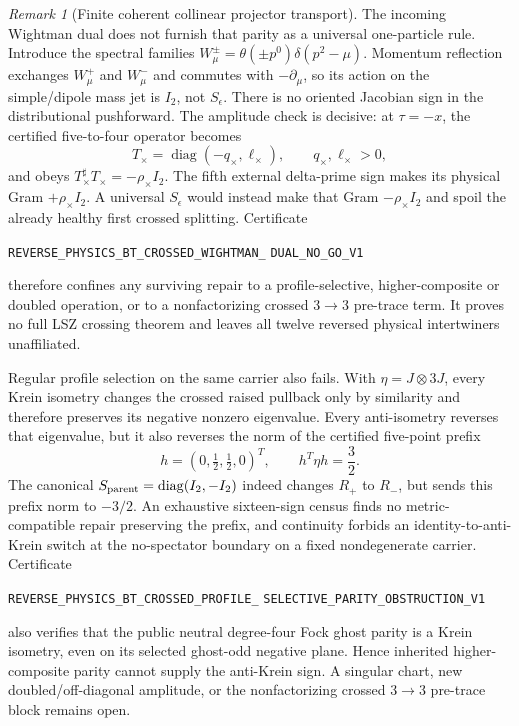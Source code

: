 \documentclass[11pt]{article}
\theoremstyle{definition}
\theoremstyle{remark}
\newtheorem{remark}[theorem]{Remark}
\begin{document}
\begin{remark}[Finite coherent collinear projector transport]
The incoming Wightman dual does not furnish that parity as a universal
one-particle rule.  Introduce the spectral families
$W_\mu^\pm=\theta(\pm p^0)\delta(p^2-\mu)$.  Momentum reflection exchanges
$W_\mu^+$ and $W_\mu^-$ and commutes with $-\partial_\mu$, so its action on
the simple/dipole mass jet is $I_2$, not $S_\epsilon$.  There is no oriented
Jacobian sign in the distributional pushforward.  The amplitude check is
decisive: at $\tau=-x$, the certified five-to-four operator becomes
\[
 T_\times=\operatorname{diag}(-q_\times,\ell_\times),
 \qquad q_\times,\ell_\times>0,
\]
and obeys $T_\times^\sharp T_\times=-\rho_\times I_2$.  The fifth external
delta-prime sign makes its physical Gram $+\rho_\times I_2$.  A universal
$S_\epsilon$ would instead make that Gram $-\rho_\times I_2$ and spoil the
already healthy first crossed splitting.  Certificate
\par\noindent
\texttt{REVERSE\_PHYSICS\_BT\_CROSSED\_WIGHTMAN\_}
\allowbreak\texttt{DUAL\_NO\_GO\_V1}
\par\noindent
therefore confines any surviving repair to a profile-selective,
higher-composite or doubled operation, or to a nonfactorizing crossed
$3\to3$ pre-trace term.  It proves no full LSZ crossing theorem and leaves
all twelve reversed physical intertwiners unaffiliated.

Regular profile selection on the same carrier also fails.  With
$\eta=J\otimes3J$, every Krein isometry changes the crossed raised pullback
only by similarity and therefore preserves its negative nonzero eigenvalue.
Every anti-isometry reverses that eigenvalue, but it also reverses the norm of
the certified five-point prefix
\[
 h=(0,\tfrac12,\tfrac12,0)^T,
 \qquad h^T\eta h=\frac32.
\]
The canonical $S_{\rm parent}=\operatorname{diag}(I_2,-I_2)$ indeed changes
$R_+$ to $R_-$, but sends this prefix norm to $-3/2$.  An exhaustive
sixteen-sign census finds no metric-compatible repair preserving the prefix,
and continuity forbids an identity-to-anti-Krein switch at the no-spectator
boundary on a fixed nondegenerate carrier.  Certificate
\par\noindent
\texttt{REVERSE\_PHYSICS\_BT\_CROSSED\_PROFILE\_}
\allowbreak\texttt{SELECTIVE\_PARITY\_OBSTRUCTION\_V1}
\par\noindent
also verifies that the public neutral degree-four Fock ghost parity is a
Krein isometry, even on its selected ghost-odd negative plane.  Hence inherited
higher-composite parity cannot supply the anti-Krein sign.  A singular chart,
new doubled/off-diagonal amplitude, or the nonfactorizing crossed $3\to3$
pre-trace block remains open.


\end{remark}
\end{document}
